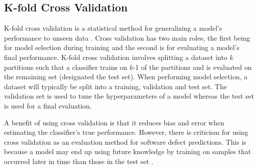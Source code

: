 \documentclass[../main.tex]{subfiles}
\begin{document}
\subsection{K-fold Cross Validation}

K-fold cross validation is a statistical method for generalizing a model's performance to unseen data \cite{kale2011cross}. Cross validation has two main roles, the first being for model selection during training and the second is for evaluating a model's final performance. K-fold cross validation involves splitting a dataset into $k$ partitions such that a classifier trains on $k$-1 of the partitions and is evaluated on the remaining set (designated the test set). When performing model selection, a dataset will typically be split into a training, validation and test set. The validation set is used to tune the hyperparameters of a model whereas the test set is used for a final evaluation.

A benefit of using cross validation is that it reduces bias and error when estimating the classifier's true performance. However, there is criticism for using cross validation as an evaluation method for software defect predictions. This is because a model may end up using future knowledge by training on samples that occurred later in time than those in the test set \cite{tan2015online}. 

\end{document}
